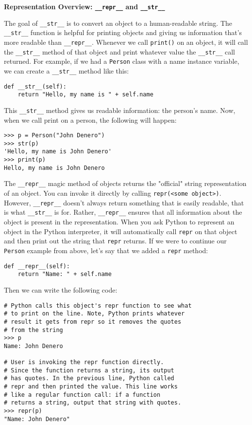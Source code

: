 \textbf{Representation Overview: \lstinline{__repr__} and \lstinline{__str__}}

The goal of \lstinline{__str__} is to convert an object to a human-readable string. The \lstinline{__str__} function is helpful for printing objects and giving us information that's more readable than \lstinline{__repr__}. Whenever we call \lstinline{print()} on an object, it will call the \lstinline{__str__} method of that object and print whatever value the \lstinline{__str__} call returned. For example, if we had a \lstinline{Person} class with a name instance variable, we can create a \lstinline{__str__} method like this:
\begin{lstlisting}
def __str__(self):
    return "Hello, my name is " + self.name
\end{lstlisting}
This \lstinline{__str__} method gives us readable information: the person's name. Now, when we call print on a person, the following will happen:
\begin{lstlisting}
>>> p = Person("John Denero")
>>> str(p)
'Hello, my name is John Denero'
>>> print(p)
Hello, my name is John Denero
\end{lstlisting}

The \lstinline{__repr__} magic method of objects returns the "official" string representation of an object. You can invoke it directly by calling \lstinline{repr(<some object>)}. However, \lstinline{__repr__} doesn't always return something that is easily readable, that is what \lstinline{__str__} is for. Rather, \lstinline{__repr__} ensures that all information about the object is present in the representation. When you ask Python to represent an object in the Python interpreter, it will automatically call \lstinline{repr} on that object and then print out the string that \lstinline{repr} returns. If we were to continue our \lstinline{Person} example from above, let's say that we added a \lstinline{repr} method:

\begin{lstlisting}
def __repr__(self):
    return "Name: " + self.name
\end{lstlisting}

Then we can write the following code:

\begin{lstlisting}
# Python calls this object's repr function to see what
# to print on the line. Note, Python prints whatever
# result it gets from repr so it removes the quotes
# from the string
>>> p
Name: John Denero

# User is invoking the repr function directly.
# Since the function returns a string, its output
# has quotes. In the previous line, Python called
# repr and then printed the value. This line works
# like a regular function call: if a function
# returns a string, output that string with quotes.
>>> repr(p)
"Name: John Denero"
\end{lstlisting}

